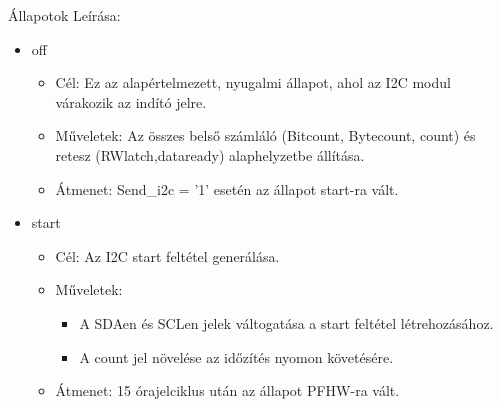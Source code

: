 \documentclass[a4paper,12pt,oneside]{book}
\begin{document}
Állapotok Leírása:
\begin{itemize}
	\item off \begin{itemize}
		\item Cél: Ez az alapértelmezett, nyugalmi állapot, ahol az I2C modul várakozik az indító jelre.
		\item Műveletek: Az összes belső számláló (Bitcount, Bytecount, count) és retesz (RWlatch,dataready) alaphelyzetbe állítása.
		\item Átmenet: Send\_i2c = '1' esetén az állapot start-ra vált.
	\end{itemize}
	\item start \begin{itemize}
		\item Cél: Az I2C start feltétel generálása.
		\item Műveletek: \begin{itemize}
			\item A SDAen és SCLen jelek váltogatása a start feltétel létrehozásához.
			\item A count jel növelése az időzítés nyomon követésére.
		\end{itemize}
		\item Átmenet: 15 órajelciklus után az állapot PFHW-ra vált.
	\end{itemize}


\end{itemize}
\end{document}
